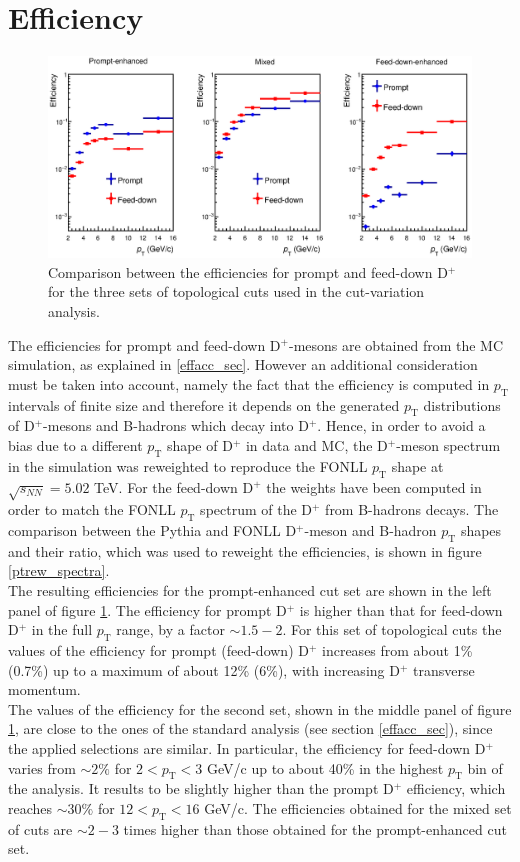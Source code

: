 \documentclass[b5paper,10pt,twoside,oldstyle,classica]{toptesi}
\newcommand{\pt}{p_\text{T}}
\begin{document}
\section{Efficiency}
\label{cutvar_eff_sec}
\begin{figure}[tb]
\begin{center}
\includegraphics[scale = 0.65]{Eff3Sets.eps}
\caption{Comparison between the efficiencies for prompt and feed-down D$^+$ for the three sets of topological cuts used in the cut-variation analysis.}
\label{cutvar_eff}
\end{center}
\end{figure}
The efficiencies for prompt and feed-down D$^+$-mesons are obtained from the MC simulation, as explained in \ref{effacc_sec}. However an additional consideration must be taken into account, namely the fact that the efficiency is computed in $\pt$ intervals of finite size and therefore it depends on the generated $\pt$ distributions of D$^+$-mesons and B-hadrons which decay into D$^+$. Hence, in order to avoid a bias due to a different $\pt$ shape of D$^+$ in data and MC, the D$^+$-meson spectrum in the simulation was reweighted to reproduce the FONLL $\pt$ shape at $\sqrt{s_{NN}} = 5.02$ TeV. For the feed-down D$^+$ the weights have been computed in order to match the FONLL $\pt$ spectrum of the D$^+$ from B-hadrons decays. The comparison between the Pythia and FONLL D$^+$-meson and B-hadron $\pt$ shapes and their ratio, which was used to reweight the efficiencies, is shown in figure \ref{ptrew_spectra}.\\
The resulting efficiencies for the prompt-enhanced cut set are shown in the left panel of figure \ref{cutvar_eff}. The efficiency for prompt D$^+$ is higher than that for feed-down D$^+$ in the full $\pt$ range, by a factor $\sim 1.5-2$. For this set of topological cuts the values of the efficiency for prompt (feed-down) D$^+$ increases from about 1\% (0.7\%) up to a maximum of about 12\% (6\%), with increasing D$^+$ transverse momentum. \\ The values of the efficiency for the second set, shown in the middle panel of figure \ref{cutvar_eff}, are close to the ones of the standard analysis (see section \ref{effacc_sec}), since the applied selections are similar. In particular, the efficiency for feed-down D$^+$ varies from $\sim 2\%$ for $2<\pt<3$ GeV/c up to about 40\% in the highest $\pt$ bin of the analysis. It results to be slightly higher than the prompt D$^+$ efficiency, which reaches $\sim 30\%$ for $12<\pt<16$ GeV/c. The efficiencies obtained for the mixed set of cuts are $\sim2-3$ times higher than those obtained for the prompt-enhanced cut set.\\
\end{document}
